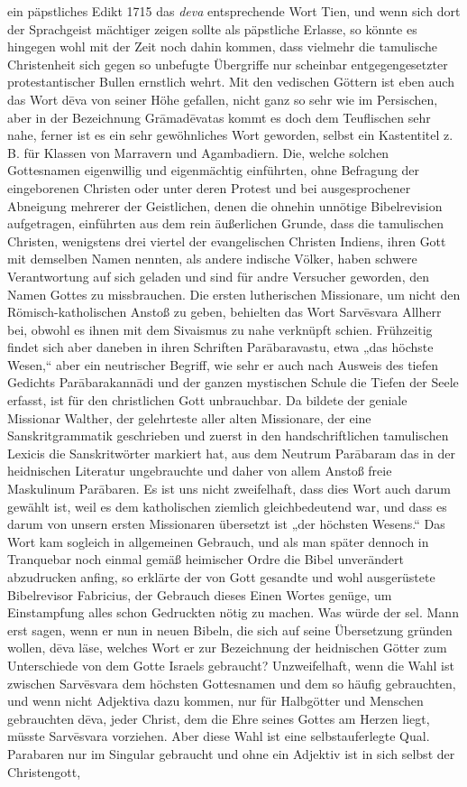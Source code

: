 \documentclass{article}
\begin{document}
ein päpstliches Edikt 1715 das \emph{deva} entsprechende Wort Tien, und wenn sich dort der Sprachgeist mächtiger zeigen sollte als päpstliche Erlasse, so könnte es hingegen wohl mit der Zeit noch dahin kommen, dass vielmehr die tamulische Christenheit sich gegen so unbefugte Übergriffe nur scheinbar entgegengesetzter protestantischer Bullen ernstlich wehrt. Mit den vedischen Göttern ist eben auch das Wort d\={e}va von seiner Höhe gefallen, nicht ganz so sehr wie im Persischen, aber in der Bezeichnung Gr\={a}mad\={e}vatas kommt es doch dem Teuflischen sehr nahe, ferner ist es ein sehr gewöhnliches Wort geworden, selbst ein Kastentitel z. B. für Klassen von Marravern und Agambadiern. Die, welche solchen Gottesnamen eigenwillig und eigenmächtig einführten, ohne Befragung der eingeborenen Christen oder unter deren Protest und bei ausgesprochener Abneigung mehrerer der Geistlichen, denen die ohnehin unnötige Bibelrevision aufgetragen, einführten aus dem rein äußerlichen Grunde, dass die tamulischen Christen, wenigstens drei viertel der evangelischen Christen Indiens, ihren Gott mit demselben Namen nennten, als andere indische Völker, haben schwere Verantwortung auf sich geladen und sind für andre Versucher geworden, den Namen Gottes zu missbrauchen. Die ersten lutherischen Missionare, um nicht den Römisch-katholischen Anstoß zu geben, behielten das Wort Sarv\={e}svara Allherr bei, obwohl es ihnen mit dem Sivaismus zu nahe verknüpft schien. Frühzeitig findet sich aber daneben in ihren Schriften Par\={a}baravastu, etwa „das höchste Wesen,“ aber ein neutrischer Begriff, wie sehr er auch nach Ausweis des tiefen Gedichts Par\={a}barakann\={a}di und der ganzen mystischen Schule die Tiefen der Seele erfasst, ist für den christlichen Gott unbrauchbar. Da bildete der geniale Missionar Walther, der gelehrteste aller alten Missionare, der eine Sanskritgrammatik geschrieben und zuerst in den handschriftlichen tamulischen Lexicis die Sanskritwörter markiert hat, aus dem Neutrum Par\={a}baram das in der heidnischen Literatur ungebrauchte und daher von allem Anstoß freie Maskulinum Par\={a}baren. Es ist uns nicht zweifelhaft, dass dies Wort auch darum gewählt ist, weil es dem katholischen ziemlich gleichbedeutend war, und dass es darum von unsern ersten Missionaren übersetzt ist „der höchsten Wesens.“ Das Wort kam sogleich in allgemeinen Gebrauch, und als man später dennoch in Tranquebar noch einmal gemäß heimischer Ordre die Bibel unverändert abzudrucken anfing, so erklärte der von Gott gesandte und wohl ausgerüstete Bibelrevisor Fabricius, der Gebrauch dieses Einen Wortes genüge, um Einstampfung alles schon Gedruckten nötig zu machen. Was würde der sel. Mann erst sagen, wenn er nun in neuen Bibeln, die sich auf seine Übersetzung gründen wollen, d\={e}va läse, welches Wort er zur Bezeichnung der heidnischen Götter zum Unterschiede von dem Gotte Israels gebraucht? Unzweifelhaft, wenn die Wahl ist zwischen Sarv\={e}svara dem höchsten Gottesnamen und dem so häufig gebrauchten, und wenn nicht Adjektiva dazu kommen, nur für Halbgötter und Menschen gebrauchten d\={e}va, jeder Christ, dem die Ehre seines Gottes am Herzen liegt, müsste Sarv\={e}svara vorziehen. Aber diese Wahl ist eine selbstauferlegte Qual. Parabaren nur im Singular gebraucht und ohne ein Adjektiv ist in sich selbst der Christengott, 
\end{document}
